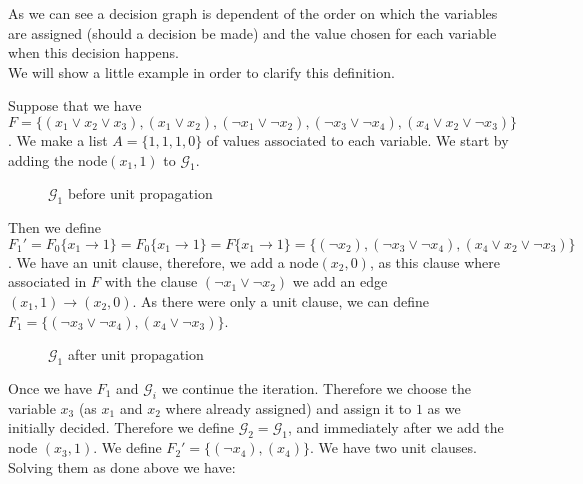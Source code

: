  As we can see a decision graph is dependent of the order on which the variables are assigned (should a decision be made) and the value chosen for each variable when this decision happens.\\

 We will show a little example in order to clarify this definition.
\begin{example} Suppose that we have 
$F = \{(x_1\vee x_2 \vee x_3), ( x_1 \vee x_2), (\neg x_1 \vee \neg x_2), (\neg x_3 \vee \neg x_4), (x_4 \vee x_2 \vee \neg x_3) \}$. 
We make a list $A=\{1,1,1,0\}$ of values associated to each variable. We start by adding the node$(x_1,1)$ to $\mathcal{G}_1$. \\
\begin{figure}[H]
  \centering
  \caption{$\mathcal{G}_1$ before unit propagation}
\end{figure}

Then we define $F_1' = F_0\{x_1\to 1\} =F_0\{x_1\to 1\} = F\{x_1 \to 1\}= \{(\neg x_2), (\neg x_3 \vee \neg x_4), (x_4 \vee x_2 \vee\neg x_3)\}$. We have an unit clause, therefore, we add a node$(x_2, 0)$, as this clause where associated in $F$ with the clause $(\neg x_1 \vee \neg x_2)$ we add an edge $(x_1,1)\to (x_2,0)$. As there were only a unit clause, we can define $F_1 = \{(\neg x_3 \vee \neg x_4), (x_4 \vee \neg x_3)\}$.

\begin{figure}[H]
  \centering
  \caption{$\mathcal{G}_1$ after unit propagation}
\end{figure} 

Once we have $F_1$ and $\mathcal{G}_i$ we continue the iteration. Therefore we choose the variable $x_3$ (as $x_1$ and $x_2$ where already assigned) and assign it to $1$ as we initially decided. Therefore we define $\mathcal{G}_2 = \mathcal{G}_1 $, and immediately after we add the node $(x_3,1)$. We define $F_2' = \{(\neg x_4), (x_4)\}$. We have two unit clauses. Solving them as done above we have: 


\end{example}
